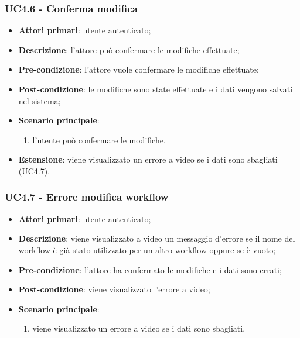 \subsubsection{UC4.6 - Conferma modifica}

\begin{itemize}
\item \textbf{Attori primari}: utente autenticato;

\item \textbf{Descrizione}: l'attore può confermare le modifiche effettuate;

\item \textbf{Pre-condizione}: l'attore vuole confermare le modifiche effettuate;

\item \textbf{Post-condizione}: le modifiche sono state effettuate e i dati vengono salvati nel sistema;

\item \textbf{Scenario principale}:
\begin{enumerate}
\item l'utente può confermare le modifiche.
\end{enumerate}
\item \textbf{Estensione}: viene visualizzato un errore a video se i dati sono sbagliati (UC4.7).
\end{itemize}

\subsubsection{UC4.7 - Errore modifica workflow}

\begin{itemize}
\item \textbf{Attori primari}: utente autenticato;

\item \textbf{Descrizione}: viene visualizzato a video un messaggio d'errore se il nome del workflow è già stato utilizzato per un altro workflow oppure se è vuoto;

\item \textbf{Pre-condizione}: l'attore ha confermato le modifiche e i dati sono errati;

\item \textbf{Post-condizione}: viene visualizzato l'errore a video;

\item \textbf{Scenario principale}:
\begin{enumerate}
\item viene visualizzato un errore a video se i dati sono sbagliati.
\end{enumerate}
\end{itemize}

